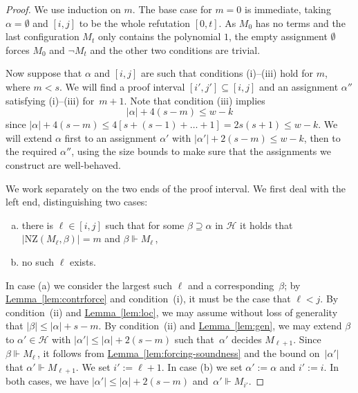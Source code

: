 \documentclass[11pt]{article}
\numberwithin{equation}{section}
\theoremstyle{definition}
\theoremstyle{plain}
\newcommand{\expref}[2]{\hyperref[#2]{#1~\ref{#2}}}
\newcommand\calH{\mathcal{H}}
\newcommand\rmNZ{\mathrm{NZ}}
\begin{document}
\begin{proof}
We use induction on $m$.
The base case for $m=0$ is immediate, taking $\alpha= \emptyset$
and $[i,j]$ to be the whole refutation $[0,t]$. 
As $M_0$ has no terms and the last configuration $M_t$ only contains the polynomial $1$, the empty assignment
$\emptyset$ forces $M_0$ and $\neg M_t$
and the other two conditions are trivial.

Now suppose that $\alpha$  and $[i,j]$ are such that conditions  (i)--(iii) 
hold for $m$, where $m < s$. 
We will find a proof interval $[i',j'] \subseteq [i,j]$ 
and an assignment $\alpha''$ satisfying (i)--(iii) for~$m+1$. 
Note that condition (iii) implies 
\begin{equation*}\label{eq:bound1}
|\alpha| + 4(s-m)  \le w-k
\end{equation*}
since
$|\alpha| + 4(s-m)  \le 
4[ s + (s-1) + \dots + 1] 
= 2s(s+1) \le w-k$.
We will extend $\alpha$ first to 
an assignment $\alpha'$ with $|\alpha'| + 2(s-m) \le w-k$, then to the required $\alpha''$,
using the size bounds to make sure that the assignments we construct are well-behaved.

We work separately on the two ends of the proof interval.
We first deal with the left end, distinguishing two cases:
\begin{enumerate}[(a)]
\item 
there is $\ell \in [i,j]$ such that for some $\beta \supseteq \alpha$ in $\calH$
it holds that $|\rmNZ(M_\ell, \beta)| = m$ and $\beta \Vdash M_\ell$\,,
\item 
no such $\ell$ exists.
\end{enumerate}
In case (a) we consider the largest such $\ell$ and a corresponding~$\beta$; 
by \expref{Lemma}{lem:contrforce} and condition~(i), it must be the case that $\ell < j$. 
By condition~(ii) and \expref{Lemma}{lem:loc}, we may assume without
loss of generality that $|\beta| \le |\alpha| + s-m$.
By condition~(ii) and \expref{Lemma}{lem:gen}, we may extend $\beta$
to $\alpha' \in \calH$ with $|\alpha'| \le |\alpha| + 2(s-m)$ 
such that~$\alpha'$ decides $M_{\ell +1}$.
Since $\beta \Vdash M_{\ell}$\,, 
it follows from \expref{Lemma}{lem:forcing-soundness} and the bound on~$|\alpha'|$ that 
$\alpha' \Vdash M_{\ell+1}$. We set $i' := \ell +1$.
In case (b) we set $\alpha' :=\alpha$ and  $i' := i$.
In both cases,
we have $|\alpha'| \le |\alpha|+2(s-m)$ and~$\alpha' \Vdash M_{i'}$.


\end{proof}
\end{document}
